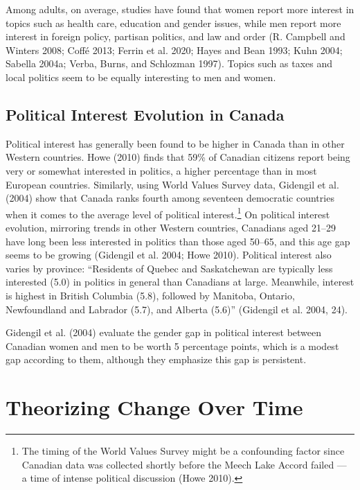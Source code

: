 \documentclass[
  letterpaper,
  DIV=11,
  numbers=noendperiod]{scrreprt}
\begin{document}
Among adults, on average, studies have found that women report more
interest in topics such as health care, education and gender issues,
while men report more interest in foreign policy, partisan politics, and
law and order (R. Campbell and Winters 2008; Coffé 2013; Ferrin et al.
2020; Hayes and Bean 1993; Kuhn 2004; Sabella 2004a; Verba, Burns, and
Schlozman 1997). Topics such as taxes and local politics seem to be
equally interesting to men and women.

\hypertarget{political-interest-evolution-in-canada}{%
\subsection{Political Interest Evolution in
Canada}\label{political-interest-evolution-in-canada}}

Political interest has generally been found to be higher in Canada than
in other Western countries. Howe (2010) finds that 59\% of Canadian
citizens report being very or somewhat interested in politics, a higher
percentage than in most European countries. Similarly, using World
Values Survey data, Gidengil et al. (2004) show that Canada ranks fourth
among seventeen democratic countries when it comes to the average level
of political interest.\footnote{The timing of the World Values Survey
  might be a confounding factor since Canadian data was collected
  shortly before the Meech Lake Accord failed --- a time of intense
  political discussion (Howe 2010).} On political interest evolution,
mirroring trends in other Western countries, Canadians aged 21--29 have
long been less interested in politics than those aged 50--65, and this
age gap seems to be growing (Gidengil et al. 2004; Howe 2010). Political
interest also varies by province: ``Residents of Quebec and Saskatchewan
are typically less interested (5.0) in politics in general than
Canadians at large. Meanwhile, interest is highest in British Columbia
(5.8), followed by Manitoba, Ontario, Newfoundland and Labrador (5.7),
and Alberta (5.6)'' (Gidengil et al. 2004, 24).

Gidengil et al. (2004) evaluate the gender gap in political interest
between Canadian women and men to be worth 5 percentage points, which is
a modest gap according to them, although they emphasize this gap is
persistent.

\hypertarget{theorizing-change-over-time}{%
\section{Theorizing Change Over
Time}\label{theorizing-change-over-time}}
\end{document}
